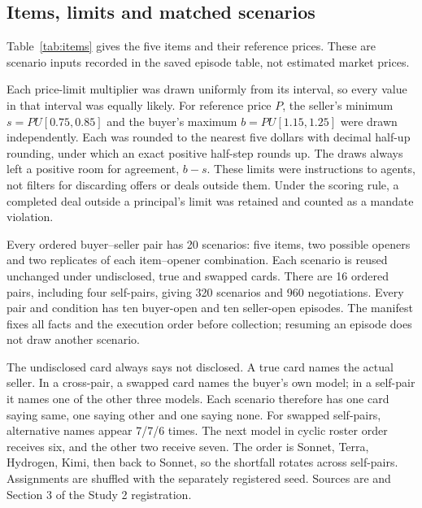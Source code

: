 \subsection{Items, limits and matched scenarios}
\label{subapp:items-limits-and-matched-scenarios}
Table~\ref{tab:items} gives the five items and their reference prices. These are scenario inputs recorded in the saved episode table, not estimated market prices.


Each price-limit multiplier was drawn uniformly from its interval, so every value in that interval was equally likely. For reference price $P$, the seller's minimum $s=P U[0.75,0.85]$ and the buyer's maximum $b=P U[1.15,1.25]$ were drawn independently. Each was rounded to the nearest five dollars with decimal half-up rounding, under which an exact positive half-step rounds up. The draws always left a positive room for agreement, $b-s$. These limits were instructions to agents, not filters for discarding offers or deals outside them. Under the scoring rule, a completed deal outside a principal's limit was retained and counted as a mandate violation.

Every ordered buyer--seller pair has 20 scenarios: five items, two possible openers and two replicates of each item--opener combination. Each scenario is reused unchanged under undisclosed, true and swapped cards. There are 16 ordered pairs, including four self-pairs, giving 320 scenarios and 960 negotiations. Every pair and condition has ten buyer-open and ten seller-open episodes. The manifest fixes all facts and the execution order before collection; resuming an episode does not draw another scenario.

The undisclosed card always says not disclosed. A true card names the actual seller. In a cross-pair, a swapped card names the buyer's own model; in a self-pair it names one of the other three models. Each scenario therefore has one card saying same, one saying other and one saying none. For swapped self-pairs, alternative names appear 7/7/6 times. The next model in cyclic roster order receives six, and the other two receive seven. The order is Sonnet, Terra, Hydrogen, Kimi, then back to Sonnet, so the shortfall rotates across self-pairs. Assignments are shuffled with the separately registered seed. Sources are  and Section 3 of the Study 2 registration.

